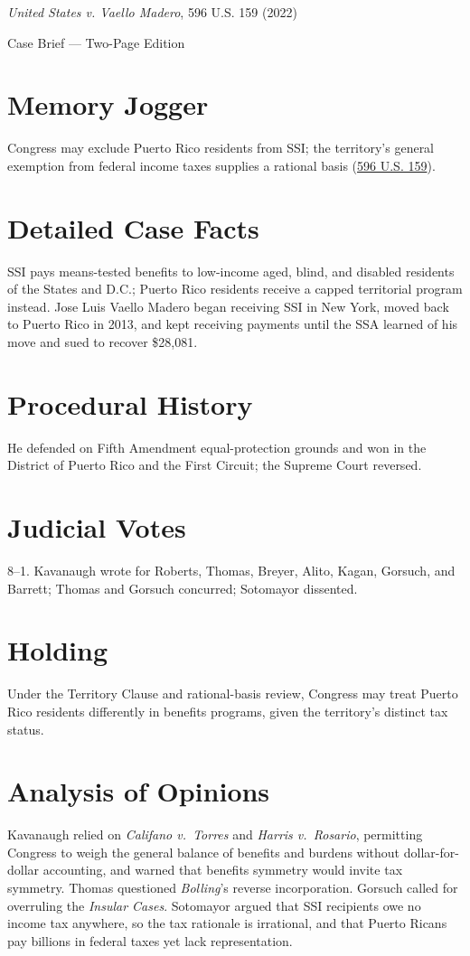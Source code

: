 \documentclass[12pt]{article}
\begin{document}
\begin{center}
{\LARGE \textit{United States v. Vaello Madero}, 596 U.S. 159 (2022)\par}
\vspace{0.5em}
{\large Case Brief --- Two-Page Edition\par}
\end{center}

\section{Memory Jogger}
Congress may exclude Puerto Rico residents from SSI; the territory's general exemption from federal income taxes supplies a rational basis (\href{https://www.law.cornell.edu/supremecourt/text/20-303}{596 U.S. 159}).

\section{Detailed Case Facts}
SSI pays means-tested benefits to low-income aged, blind, and disabled residents of the States and D.C.; Puerto Rico residents receive a capped territorial program instead. Jose Luis Vaello Madero began receiving SSI in New York, moved back to Puerto Rico in 2013, and kept receiving payments until the SSA learned of his move and sued to recover \$28,081.

\section{Procedural History}
He defended on Fifth Amendment equal-protection grounds and won in the District of Puerto Rico and the First Circuit; the Supreme Court reversed.

\section{Judicial Votes}
8--1. Kavanaugh wrote for Roberts, Thomas, Breyer, Alito, Kagan, Gorsuch, and Barrett; Thomas and Gorsuch concurred; Sotomayor dissented.

\section{Holding}
Under the Territory Clause and rational-basis review, Congress may treat Puerto Rico residents differently in benefits programs, given the territory's distinct tax status.

\section{Analysis of Opinions}
Kavanaugh relied on \textit{Califano v.\ Torres} and \textit{Harris v.\ Rosario}, permitting Congress to weigh the general balance of benefits and burdens without dollar-for-dollar accounting, and warned that benefits symmetry would invite tax symmetry. Thomas questioned \textit{Bolling}'s reverse incorporation. Gorsuch called for overruling the \textit{Insular Cases}. Sotomayor argued that SSI recipients owe no income tax anywhere, so the tax rationale is irrational, and that Puerto Ricans pay billions in federal taxes yet lack representation.
\end{document}
